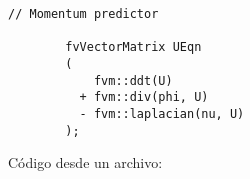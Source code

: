 \documentclass[../Main.tex]{subfiles}
\begin{document}
\label{c:codigo}

\begin{lstlisting}[style=myStyle,firstnumber=58]
        // Momentum predictor

        fvVectorMatrix UEqn
        (
            fvm::ddt(U)
          + fvm::div(phi, U)
          - fvm::laplacian(nu, U)
        );
\end{lstlisting}

Código desde un archivo: 


\end{document}
